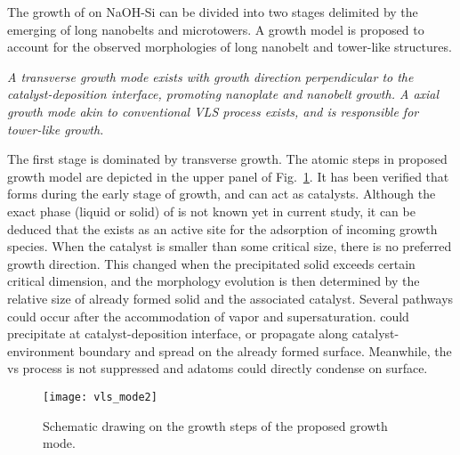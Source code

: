 The growth of  on NaOH-Si can be divided into two stages delimited by the emerging of long nanobelts and microtowers. A growth model is proposed to account for the observed morphologies of  long nanobelt and tower-like structures.
 
\emph{
A transverse growth mode exists with growth direction perpendicular to the catalyst-deposition interface, promoting  nanoplate and nanobelt growth. A axial growth mode akin to conventional VLS process exists, and is responsible for  tower-like growth.
}

The first stage is dominated by transverse growth. The atomic steps in proposed growth model are depicted in the upper panel of Fig.~\ref{fig:ch4vls}. It has been verified that  forms during the early stage of growth, and can act as catalysts. Although the exact phase (liquid or solid) of  is not known yet in current study, it can be deduced that the  exists as an active site for the adsorption of incoming  growth species. When the catalyst is smaller than some critical size, there is no preferred growth direction. This changed when the precipitated solid exceeds certain critical dimension, and the morphology evolution is then determined by the relative size of already formed solid and the associated catalyst. Several pathways could occur after the accommodation of  vapor and supersaturation.  could precipitate at catalyst-deposition interface, or propagate along catalyst-environment boundary and spread on the already formed  surface. Meanwhile, the \gls{vs} process is not suppressed and  adatoms could directly condense on  surface.

\begin{figure}[htb]
\centering
\texttt{[image: vls\_mode2]}
\caption[Schematic drawing on the growth steps of the proposed growth mode]{Schematic drawing on the growth steps of the proposed growth mode.}
\label{fig:ch4vls}
\end{figure}

